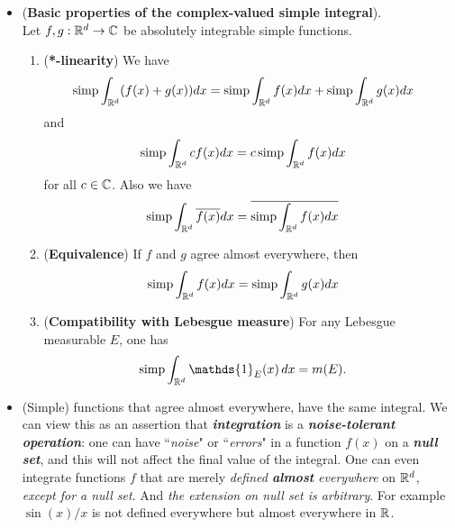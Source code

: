 \documentclass[11pt]{article}
\begin{document}
\begin{itemize}
\item \begin{proposition} (\textbf{Basic properties of the complex-valued simple integral}). \\
Let $f, g: {\mathbb R}^d \rightarrow {\mathbb C}$ be absolutely integrable simple functions.
\begin{enumerate}
\item (\textbf{*-linearity}) We have
\begin{align*}
\text{simp} \int_{{\mathbb R}^d} (f(x) + g(x)) dx &= \text{simp} \int_{{\mathbb R}^d} f(x) dx +  \text{simp} \int_{{\mathbb R}^d} g(x) dx
\end{align*}
and
\begin{align*}
\text{simp} \int_{{\mathbb R}^d} cf(x)  dx &=c\, \text{simp} \int_{{\mathbb R}^d} f(x) dx
\end{align*}
for all $c \in {\mathbb C}$. Also we have
\begin{align*}
\text{simp} \int_{{\mathbb R}^d} \overline{f(x)}  dx &= \overline{\text{simp} \int_{{\mathbb R}^d} f(x) dx}
\end{align*}
\item  (\textbf{Equivalence}) If $f$ and $g$ agree almost everywhere, then
\begin{align*}
\text{simp} \int_{{\mathbb R}^d} f(x) dx &= \text{simp} \int_{{\mathbb R}^d} g(x) dx
\end{align*}
\item (\textbf{Compatibility with Lebesgue measure}) For any Lebesgue measurable $E$, one has
\begin{align*}
\text{simp} \int_{\bR^d} \mathds{1}_{E}(x)\,dx &= m(E). 
\end{align*}
\end{enumerate}
\end{proposition}


\item \begin{remark}
(Simple) functions that agree almost everywhere, have the same integral. We can view this
as an assertion that \emph{\textbf{integration}} is a \emph{\textbf{noise-tolerant operation}}: one can have ``\emph{noise}" or ``\emph{errors}" in a function $f(x)$ on a \emph{\textbf{null set}}, and this will not affect the final value of the integral. One can even integrate functions $f$ that are merely \emph{defined \textbf{almost} everywhere} on ${\mathbb R}^d$, \emph{except for a null set}. And \emph{the extension on null set is arbitrary}. For example $\sin(x)/x$ is not defined everywhere but almost everywhere in ${\mathbb R}$.  


\end{remark}
\end{itemize}
\end{document}
